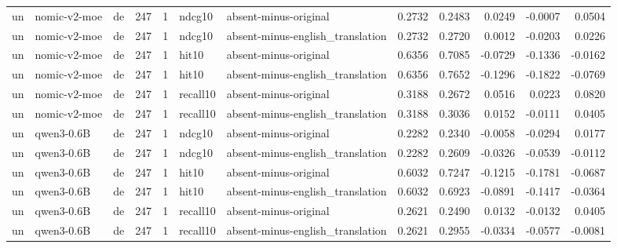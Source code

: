 \begin{tabular}{lllrrllrrrrr}
un & nomic-v2-moe & de & 247 & 1 & ndcg10 & absent-minus-original & 0.2732 & 0.2483 & 0.0249 & -0.0007 & 0.0504 \\
un & nomic-v2-moe & de & 247 & 1 & ndcg10 & absent-minus-english\_translation & 0.2732 & 0.2720 & 0.0012 & -0.0203 & 0.0226 \\
un & nomic-v2-moe & de & 247 & 1 & hit10 & absent-minus-original & 0.6356 & 0.7085 & -0.0729 & -0.1336 & -0.0162 \\
un & nomic-v2-moe & de & 247 & 1 & hit10 & absent-minus-english\_translation & 0.6356 & 0.7652 & -0.1296 & -0.1822 & -0.0769 \\
un & nomic-v2-moe & de & 247 & 1 & recall10 & absent-minus-original & 0.3188 & 0.2672 & 0.0516 & 0.0223 & 0.0820 \\
un & nomic-v2-moe & de & 247 & 1 & recall10 & absent-minus-english\_translation & 0.3188 & 0.3036 & 0.0152 & -0.0111 & 0.0405 \\
un & qwen3-0.6B & de & 247 & 1 & ndcg10 & absent-minus-original & 0.2282 & 0.2340 & -0.0058 & -0.0294 & 0.0177 \\
un & qwen3-0.6B & de & 247 & 1 & ndcg10 & absent-minus-english\_translation & 0.2282 & 0.2609 & -0.0326 & -0.0539 & -0.0112 \\
un & qwen3-0.6B & de & 247 & 1 & hit10 & absent-minus-original & 0.6032 & 0.7247 & -0.1215 & -0.1781 & -0.0687 \\
un & qwen3-0.6B & de & 247 & 1 & hit10 & absent-minus-english\_translation & 0.6032 & 0.6923 & -0.0891 & -0.1417 & -0.0364 \\
un & qwen3-0.6B & de & 247 & 1 & recall10 & absent-minus-original & 0.2621 & 0.2490 & 0.0132 & -0.0132 & 0.0405 \\
un & qwen3-0.6B & de & 247 & 1 & recall10 & absent-minus-english\_translation & 0.2621 & 0.2955 & -0.0334 & -0.0577 & -0.0081 \\
\bottomrule
\end{tabular}
